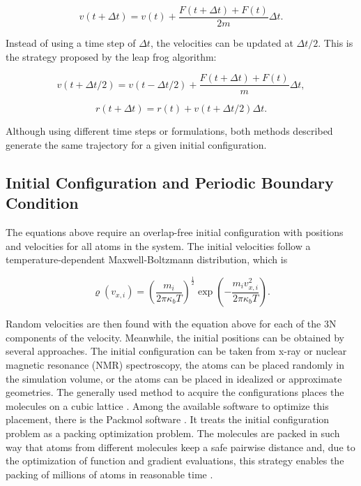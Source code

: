 \begin{equation}
v(t+ \Delta t) = v(t) +\frac{F(t+ \Delta t) +F(t)}{2m} \Delta t .
\end{equation}

Instead of using a time step of $\Delta t$, the velocities can be updated at $\Delta t /2$. This is the strategy proposed by the leap frog algorithm:

\begin{equation}
v(t+ \Delta t /2) = v(t- \Delta t /2) +\frac{F(t+ \Delta t) +F(t)}{m} \Delta t ,
\end{equation}

\begin{equation}
r(t+ \Delta t) = r(t) +v(t+ \Delta t /2) \Delta t .
\end{equation}

Although using different time steps or formulations, both methods described generate the same trajectory for a given initial configuration.

\subsection{Initial Configuration and Periodic Boundary Condition}

The equations above require an overlap-free initial configuration with positions and velocities for all atoms in the system. The initial velocities follow a temperature-dependent Maxwell-Boltzmann distribution, which is

\begin{equation}
\varrho (v_{x,i}) = \left (\frac{m_{i}}{2 \pi \kappa_{b} T} \right )^{\frac{1}{2}} \exp \left (-\frac{m_{i}v_{x,i}^2}{2 \pi \kappa_{b} T} \right) .
\end{equation}

Random velocities are then found with the equation above for each of the 3N components of the velocity. Meanwhile, the initial positions can be obtained by several approaches. The initial configuration can be taken from x-ray or nuclear magnetic resonance (NMR) spectroscopy, the atoms can be placed randomly in the simulation volume, or the atoms can be placed in idealized or approximate geometries. The generally used method to acquire the configurations places the molecules on a cubic lattice \cite{shell2015}.  Among the available software to optimize this placement, there is the Packmol software \cite{packmol}. It treats the initial configuration problem as a packing optimization problem. The molecules are packed in such way that atoms from different molecules keep a safe pairwise distance and, due to the optimization of function and gradient evaluations, this strategy enables the packing of millions of atoms in reasonable time \cite{packmol}.   


